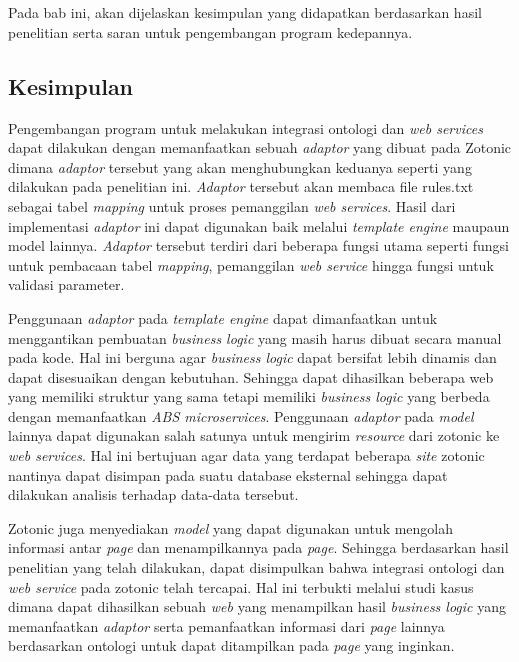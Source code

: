 \chapter{\babEnam}
Pada bab ini, akan dijelaskan kesimpulan yang didapatkan berdasarkan hasil penelitian serta saran untuk pengembangan program kedepannya.
\section{Kesimpulan}
Pengembangan program untuk melakukan integrasi ontologi dan \textit{web services} dapat dilakukan dengan memanfaatkan sebuah \textit{adaptor} yang dibuat pada Zotonic dimana \textit{adaptor} tersebut yang akan menghubungkan keduanya seperti yang dilakukan pada penelitian ini. \textit{Adaptor} tersebut akan membaca file rules.txt sebagai tabel \textit{mapping} untuk proses pemanggilan \textit{web services}. Hasil dari implementasi \textit{adaptor} ini dapat digunakan baik melalui \textit{template engine} maupaun model lainnya. \textit{Adaptor} tersebut terdiri dari beberapa fungsi utama seperti fungsi untuk pembacaan tabel \textit{mapping}, pemanggilan \textit{web service} hingga fungsi untuk validasi parameter.

Penggunaan \textit{adaptor} pada \textit{template engine} dapat dimanfaatkan untuk menggantikan pembuatan \textit{business logic} yang masih harus dibuat secara manual pada kode. Hal ini berguna agar \textit{business logic} dapat bersifat lebih dinamis dan dapat disesuaikan dengan kebutuhan. Sehingga dapat dihasilkan beberapa web yang memiliki struktur yang sama tetapi memiliki \textit{business logic} yang berbeda dengan memanfaatkan \textit{ABS microservices}. Penggunaan \textit{adaptor} pada \textit{model} lainnya dapat digunakan salah satunya untuk mengirim \textit{resource} dari zotonic ke \textit{web services}. Hal ini bertujuan agar data yang terdapat beberapa \textit{site} zotonic nantinya dapat disimpan pada suatu database eksternal sehingga dapat dilakukan analisis terhadap data-data tersebut.

Zotonic juga menyediakan \textit{model} yang dapat digunakan untuk mengolah informasi antar \textit{page} dan menampilkannya pada \textit{page}. Sehingga berdasarkan hasil penelitian yang telah dilakukan, dapat disimpulkan bahwa integrasi ontologi dan \textit{web service} pada zotonic telah tercapai. Hal ini terbukti melalui studi kasus dimana dapat dihasilkan sebuah \textit{web} yang menampilkan hasil \textit{business logic} yang memanfaatkan \textit{adaptor} serta pemanfaatkan informasi dari \textit{page} lainnya berdasarkan ontologi untuk dapat ditampilkan pada \textit{page} yang inginkan.
